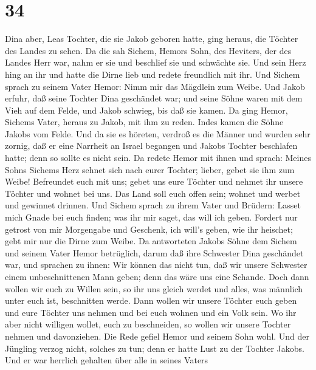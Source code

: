 \hypertarget{section-33}{%
\section{34}\label{section-33}}

 Dina aber, Leas Tochter, die sie Jakob geboren hatte, ging
heraus, die Töchter des Landes zu sehen.  Da die sah Sichem,
Hemors Sohn, des Heviters, der des Landes Herr war, nahm er sie und
beschlief sie und schwächte sie.  Und sein Herz hing an ihr
und hatte die Dirne lieb und redete freundlich mit ihr.  Und
Sichem sprach zu seinem Vater Hemor: Nimm mir das Mägdlein zum Weibe.
 Und Jakob erfuhr, daß seine Tochter Dina geschändet war;
und seine Söhne waren mit dem Vieh auf dem Felde, und Jakob schwieg, bis
daß sie kamen.  Da ging Hemor, Sichems Vater, heraus zu
Jakob, mit ihm zu reden.  Indes kamen die Söhne Jakobs vom
Felde. Und da sie es höreten, verdroß es die Männer und wurden sehr
zornig, daß er eine Narrheit an Israel begangen und Jakobs Tochter
beschlafen hatte; denn so sollte es nicht sein.  Da redete
Hemor mit ihnen und sprach: Meines Sohns Sichems Herz sehnet sich nach
eurer Tochter; lieber, gebet sie ihm zum Weibe!  Befreundet
euch mit uns; gebet uns eure Töchter und nehmet ihr unsere Töchter
 und wohnet bei uns. Das Land soll euch offen sein; wohnet
und werbet und gewinnet drinnen.  Und Sichem sprach zu
ihrem Vater und Brüdern: Lasset mich Gnade bei euch finden; was ihr mir
saget, das will ich geben.  Fordert nur getrost von mir
Morgengabe und Geschenk, ich will's geben, wie ihr heischet; gebt mir
nur die Dirne zum Weibe.  Da antworteten Jakobs Söhne dem
Sichem und seinem Vater Hemor betrüglich, darum daß ihre Schwester Dina
geschändet war,  und sprachen zu ihnen: Wir können das
nicht tun, daß wir unsere Schwester einem unbeschnittenen Mann geben;
denn das wäre uns eine Schande.  Doch dann wollen wir euch
zu Willen sein, so ihr uns gleich werdet und alles, was männlich unter
euch ist, beschnitten werde.  Dann wollen wir unsere
Töchter euch geben und eure Töchter uns nehmen und bei euch wohnen und
ein Volk sein.  Wo ihr aber nicht willigen wollet, euch zu
beschneiden, so wollen wir unsere Tochter nehmen und davonziehen.
 Die Rede gefiel Hemor und seinem Sohn wohl. 
Und der Jüngling verzog nicht, solches zu tun; denn er hatte Lust zu der
Tochter Jakobs. Und er war herrlich gehalten über alle in seines Vaters
